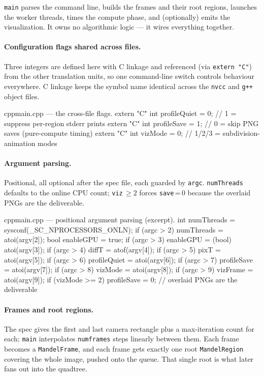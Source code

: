 \documentclass[
	english,
	letterpaper, oneside
]{article}
\begin{document}
\texttt{main} parses the command line, builds the frames and their root regions,
launches the worker threads, times the compute phase, and (optionally) emits the
visualization. It owns no algorithmic logic --- it wires everything together.

\paragraph{Configuration flags shared across files.} Three integers are defined
here with C linkage and referenced (via \texttt{extern "C"}) from the other
translation units, so one command-line switch controls behaviour everywhere. C
linkage keeps the symbol name identical across the \texttt{nvcc} and \texttt{g++}
object files.

\begin{sourcecode}{cpp}{main.cpp --- the cross-file flags.}
extern "C" int profileQuiet = 0;   // 1 = suppress per-region stderr prints
extern "C" int profileSave  = 1;   // 0 = skip PNG saves (pure-compute timing)
extern "C" int vizMode      = 0;   // 1/2/3 = subdivision-animation modes
\end{sourcecode}

\paragraph{Argument parsing.} Positional, all optional after the spec file, each
guarded by \texttt{argc}. \texttt{numThreads} defaults to the online CPU count;
\texttt{viz}$\,\geq2$ forces \texttt{save}\,=\,0 because the overlaid PNGs are the
deliverable.

\begin{sourcecode}{cpp}{main.cpp --- positional argument parsing (excerpt).}
int numThreads = sysconf(_SC_NPROCESSORS_ONLN);
if (argc > 2) numThreads = atoi(argv[2]);
bool enableGPU = true;
if (argc > 3) enableGPU = (bool) atoi(argv[3]);
if (argc > 4) diffT       = atof(argv[4]);
if (argc > 5) pixT        = atoi(argv[5]);
if (argc > 6) profileQuiet = atoi(argv[6]);
if (argc > 7) profileSave  = atoi(argv[7]);
if (argc > 8) vizMode      = atoi(argv[8]);
if (argc > 9) vizFrame     = atoi(argv[9]);
if (vizMode >= 2) profileSave = 0;   // overlaid PNGs are the deliverable
\end{sourcecode}

\paragraph{Frames and root regions.} The spec gives the first and last camera
rectangle plus a max-iteration count for each; \texttt{main} interpolates
\texttt{numframes} steps linearly between them. Each frame becomes a
\texttt{MandelFrame}, and each frame gets exactly one root \texttt{MandelRegion}
covering the whole image, pushed onto the queue. That single root is what later
fans out into the quadtree.
\end{document}
